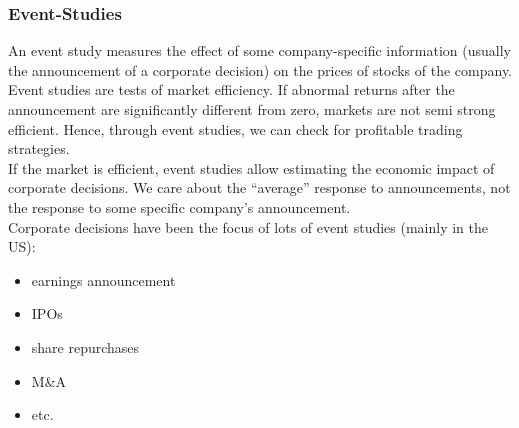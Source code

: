 \documentclass[xcolor=dvipsnames, english, 8pt]{beamer}
\begin{document}
\begin{frame}[label=Event_studies]
    \frametitle{Event-Studies}
    An event study measures the effect of some company-specific information (usually the
announcement of a corporate decision) on the prices of stocks of the company.\vspace{0.25cm}\\
Event studies are tests of market efficiency. If abnormal returns after the
announcement are significantly different from zero, markets are not semi strong
efficient. Hence, through event studies, we can check for profitable trading strategies.\vspace{0.25cm}\\
If the market is efficient, event studies allow estimating the economic impact of
corporate decisions. We care about the “average” response to announcements, not the
response to some specific company’s announcement.\vspace{0.25cm}\\
Corporate decisions have been the focus of lots of event studies (mainly in the US):\vspace{0.25cm}\\
\begin{itemize}
    \item earnings announcement
    \item IPOs
    \item share repurchases
    \item M\&A
    \item etc.
\end{itemize}
\end{frame}
\end{document}
